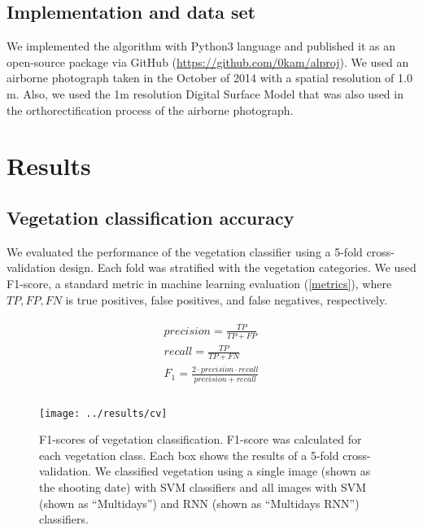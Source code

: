 \documentclass{article}
\begin{document}
\hypertarget{implementation-and-data-set}{%
\subsection{Implementation and data set}\label{implementation-and-data-set}}

We implemented the algorithm with Python3 language and published it as an open-source package via GitHub (\url{https://github.com/0kam/alproj}). We used an airborne photograph taken in the October of 2014 with a spatial resolution of 1.0 m. Also, we used the 1m resolution Digital Surface Model that was also used in the orthorectification process of the airborne photograph.

\hypertarget{results}{%
\section{Results}\label{results}}

\hypertarget{vegetation-classification-accuracy}{%
\subsection{Vegetation classification accuracy}\label{vegetation-classification-accuracy}}

We evaluated the performance of the vegetation classifier using a 5-fold cross-validation design. Each fold was stratified with the vegetation categories. We used F1-score, a standard metric in machine learning evaluation (\ref{metrics}), where \(TP, FP, FN\) is true positives, false positives, and false negatives, respectively.

\begin{align}
\label{metrics}
  \begin{gathered}
  precision = \frac{TP}{TP + FP} \\
  recall = \frac{TP}{TP + FN} \\
  F_1 = \frac{2 \cdot precision \cdot recall}{precision + recall} \\
  \end{gathered}
\end{align}



\begin{figure}
\texttt{[image: ../results/cv]} \caption{F1-scores of vegetation classification. F1-score was calculated for each vegetation class. Each box shows the results of a 5-fold cross-validation. We classified vegetation using a single image (shown as the shooting date) with SVM classifiers and all images with SVM (shown as ``Multidays'') and RNN (shown as ``Multidays RNN'') classifiers.}\label{fig:vegeacc}
\end{figure}
\end{document}
